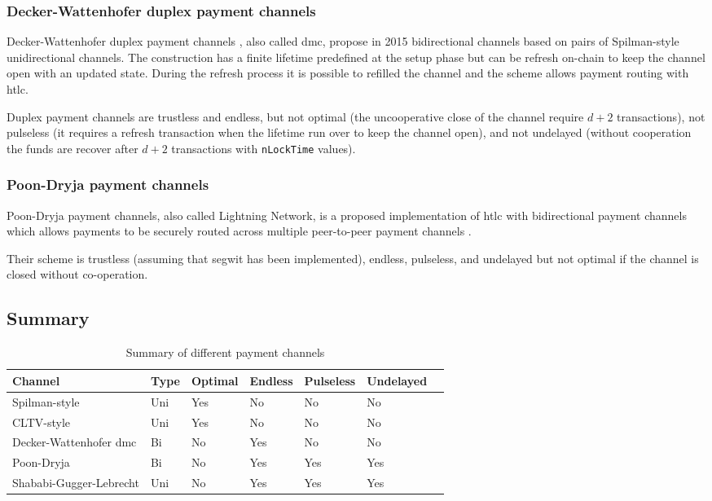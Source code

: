 \subsubsection{Decker-Wattenhofer duplex payment channels}

Decker-Wattenhofer duplex payment channels \cite{Decker2015fast}, also called
\gls{dmc}, propose in 2015 bidirectional channels based on pairs of Spilman-style
unidirectional channels. The construction has a finite lifetime predefined at the setup
phase but can be refresh on-chain to keep the channel open with an updated state. During the
refresh process it is possible to refilled the channel and the scheme allows payment routing
with \gls{htlc}.

Duplex payment channels are trustless and endless, but not optimal (the uncooperative close of the
channel require $d + 2$ transactions), not pulseless (it requires a refresh transaction
when the lifetime run over to keep the channel open), and not undelayed (without cooperation
the funds are recover after $d + 2$ transactions with \texttt{nLockTime} values).

\subsubsection{Poon-Dryja payment channels}

Poon-Dryja payment channels, also called Lightning Network, is a proposed implementation
of \gls{htlc} with bidirectional payment channels which allows payments to be securely
routed across multiple peer-to-peer payment channels \cite{poon2016bitcoin}.

Their scheme is trustless (assuming that \gls{segwit} has been implemented), endless,
pulseless, and undelayed but not optimal if the channel is closed without co-operation.

\subsection{Summary}

\begin{table}[h]
  \begin{tabularx}{\textwidth}{ | X | l | l | l | l | l | l |}
  \hline
  Channel & Type & Optimal & Endless & Pulseless & Undelayed \\ \hline \hline
  Spilman-style & Uni & Yes & No & No & No \\ \hline
  CLTV-style & Uni & Yes & No & No & No \\ \hline
  Decker-Wattenhofer \gls{dmc} & Bi & No & Yes & No & No \\ \hline
  Poon-Dryja & Bi & No & Yes & Yes & Yes \\ \hline
  Shababi-Gugger-Lebrecht & Uni & No & Yes & Yes & Yes \\
  \hline
  \end{tabularx}
  \caption{Summary of different payment channels}
  \label{fig:summaryPaymentChannel}
\end{table}

